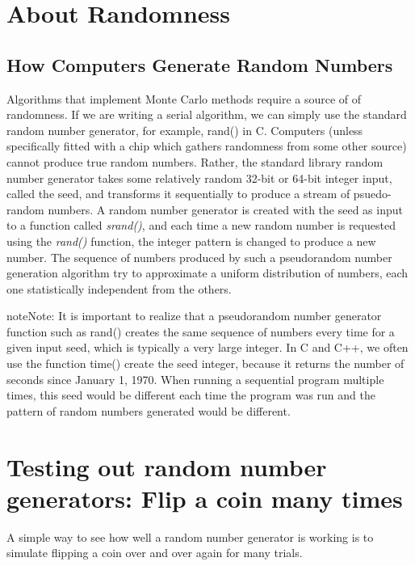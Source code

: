 \documentclass[letterpaper,10pt,openany,oneside]{sphinxmanual}
\begin{document}
\chapter{About Randomness}
\label{Introduction/Introduction:about-randomness}\label{Introduction/Introduction:monte-carlo-methods}

\section{How Computers Generate Random Numbers}
\label{Introduction/Introduction:how-computers-generate-random-numbers}
Algorithms that implement Monte Carlo methods require a source of of
randomness. If we are writing a serial algorithm, we can simply use the
standard random number generator, for example, rand() in C. Computers (unless
specifically fitted with a chip which gathers randomness from some other source)
cannot produce true random numbers. Rather, the standard library random number
generator takes some relatively random 32-bit or 64-bit integer input, called the seed,
and transforms it sequentially
to produce a stream of psuedo-random numbers. A random number generator is created
with the seed as input to a function called \emph{srand()}, and each time a new random number is requested using the \emph{rand()} function, the
integer pattern is changed to produce a new number.  The sequence of numbers produced by such a pseudorandom
number generation algorithm try to approximate a uniform distribution of numbers, each one
statistically independent from the others.

\begin{notice}{note}{Note:}
It is important to realize that a pseudorandom number generator function such
as rand() creates the same sequence of numbers every time for a given input seed, which is typically
a very large integer.  In C and C++, we often use the function time() create the seed integer,
because it returns the number of seconds since January 1, 1970.  When running a sequential
program multiple times, this seed would be different each time the program was run and the pattern
of random numbers generated would be different.
\end{notice}


\chapter{Testing out random number generators: Flip a coin many times}
\label{Introduction/CoinFlip:testing-out-random-number-generators-flip-a-coin-many-times}\label{Introduction/CoinFlip::doc}
A simple way to see how well a random number generator is working is
to simulate flipping a coin over and over again for many trials.
\end{document}

